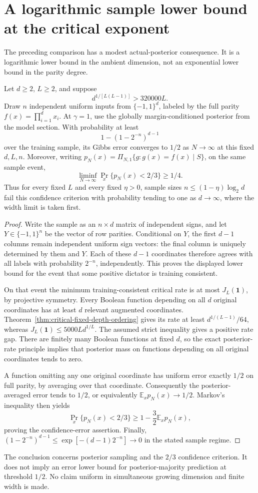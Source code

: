 \section{A logarithmic sample lower bound at the critical exponent}
\label{sec:critical-logarithmic-sample-lower}

The preceding comparison has a modest actual-posterior consequence.
It is a logarithmic lower bound in the ambient dimension, not an
exponential lower bound in the parity degree.

\begin{corollary}
\label{cor:critical-logarithmic-sample-lower}
Let $d\ge2$, $L\ge2$, and suppose
\[
 d^{1/[L(L-1)]}>320000L.
\]
Draw $n$ independent uniform inputs from $\{-1,1\}^d$, labeled by
the full parity $f(x)=\prod_{i=1}^d x_i$. At $\gamma=1$, use the
globally margin-conditioned posterior from the model section.
With probability at least
\[
 1-(1-2^{-n})^{d-1}
\]
over the training sample, its Gibbs error converges to $1/2$ as
$N\to\infty$ at this fixed $d,L,n$. Moreover, writing
$p_N(x)=\Pi_{N,1}\{g:g(x)=f(x)\mid S\}$, on the same sample event,
\[
 \liminf_{N\to\infty}
   \Pr_x\{p_N(x)<2/3\}\ge1/4.
\]
Thus for every fixed $L$ and every fixed $\eta>0$, sample sizes
$n\le(1-\eta)\log_2d$ fail this confidence criterion with probability
tending to one as $d\to\infty$, where the width limit is taken first.
\end{corollary}

\begin{proof}
Write the sample as an $n\times d$ matrix of independent signs, and
let $Y\in\{-1,1\}^n$ be the vector of row parities. Conditional on
$Y$, the first $d-1$ columns remain independent uniform sign vectors:
the final column is uniquely determined by them and $Y$. Each of
these $d-1$ coordinates therefore agrees with all labels with
probability $2^{-n}$, independently. This proves the displayed lower
bound for the event that some positive dictator is training consistent.

On that event the minimum training-consistent critical rate is at most
$J_L(\mathbf1)$, by projective symmetry. Every Boolean function depending
on all $d$ original coordinates has at least $d$ relevant augmented
coordinates. Theorem~\ref{thm:critical-fixed-depth-ordering} gives its
rate at least $d^{1/(L-1)}/64$, whereas
$J_L(\mathbf1)\le5000L d^{1/L}$. The assumed strict inequality gives
a positive rate gap. There are finitely many Boolean functions at
fixed $d$, so the exact posterior-rate principle implies that posterior
mass on functions depending on all original coordinates tends to zero.

A function omitting any one original coordinate has uniform error
exactly $1/2$ on full parity, by averaging over that coordinate.
Consequently the posterior-averaged error tends to $1/2$, or equivalently
$\mathbb E_x p_N(x)\to1/2$. Markov's inequality then yields
\[
 \Pr_x\{p_N(x)<2/3\}
 \ge1-\frac32\mathbb E_x p_N(x),
\]
proving the confidence-error assertion. Finally,
$(1-2^{-n})^{d-1}\le\exp[-(d-1)2^{-n}]\to0$ in the stated sample regime.
\end{proof}

The conclusion concerns posterior sampling and the $2/3$ confidence
criterion. It does not imply an error lower bound for posterior-majority
prediction at threshold $1/2$. No claim uniform in simultaneous growing
dimension and finite width is made.
